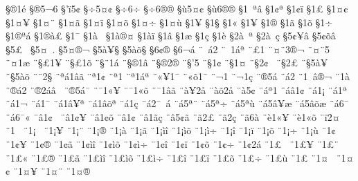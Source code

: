 {^^a7^^ae1^^e9
^^a7^^ae5^^ac6
^^a7'^^ef5^^a2
^^a7^^f75^^a4^^a2
^^a7^^f76^^ad^^f7
^^a7^^f76^^ae^^ad^^ae
^^a7^^f95^^a4^^a2
^^a7^^f96^^ae^^ad^^ae
^^a71^^a0^^aa^^e2
^^a71^^a2^^aa
^^a71^^a2^^ef
^^a71^^a3
^^a71^^a4^^a2
^^a71^^a4^^a5
^^a71^^a4^^a8
^^a71^^a4^^e3
^^a71^^a4^^ef
^^a71^^a4^^f5
^^a71^^a4^^f7
^^a71^^a4^^f9
^^a71^^a5
^^a71^^a7
^^a71^^ab
^^a71^^ad^^a5
^^a71^^ad^^ae
^^a71^^ad^^e3
^^a71^^ad^^f5
^^a71^^ad^^f7
^^a71^^ae^^aa^^e1
^^a71^^ae^^e0^^a3
^^a71^^af
^^a71^^e0^^a0
^^a71^^e0^^ae^^a4
^^a71^^e0^^ef
^^a71^^e2
^^a71^^e6
^^a71^^e7
^^a71^^e8
^^a72^^e0^^a0^^aa
^^a72^^e0^^a0^^e7
^^a75^^a2^^a5^^e2
^^a75^^a2^^f5^^e2
^^a75^^a3^^ad^^a0
^^a75^^a4^^a0.
^^a75^^a4^^ae^^ac
^^a75^^e0^^a5^^a7
^^a75^^e0^^f5^^a7
^^a76^^a2^^ae^^ad
^^a76^^ac^^e1
^^a8^^a0^^e12
^^a8^^a01^^e1^^aa
^^a8^^a31^^ad
^^a8^^a4^^a83^^ae^^ac
^^a8^^a4^^a85^^a0
^^a8^^a41^^e6
^^a8^^a7^^a31^^ad^^a5
^^a8^^a7^^a31^^ad^^f5
^^a8^^a7^^a81^^e1
^^a8^^a7^^ae1^^e2
^^a8^^a7^^ae2^^ae
^^a8^^a7'5
^^a8^^a71^^a2
^^a8^^a71^^a4
^^a8^^a72^^a2^^a0
^^a8^^a72^^a3^^ad
^^a8^^a75^^e0^^a5
^^a8^^a75^^e0^^f5
^^a8^^a82^^a7
^^a8^^aa^^e11^^e2^^e3
^^a8^^aa1^^a2
^^a8^^aa1^^ad
^^a8^^aa1^^e1^^aa
^^a8^^ab^^a51^^af
^^a8^^ab^^f51^^af
^^a8^^ac1^^ad
^^a8^^ac1^^e7
^^a8^^ad^^ae5^^e1
^^a8^^ad^^e12
^^a8^^ad1^^a0^^e2^^ae^^ac
^^a8^^ad1^^e0
^^a8^^ae^^e12
^^a8^^ae2^^e1^^e2^^a0
^^a8^^ae5^^e1^^af
^^a8^^af1^^ab^^a5
^^a8^^af1^^ab^^f5
^^a8^^af1^^e2^^e3
^^a8^^e0^^a52^^e5
^^a8^^e0^^f52^^e5
^^a8^^e05^^a2
^^a8^^e1^^aa1^^ad
^^a8^^e1^^e21^^a2
^^a8^^e11^^a1
^^a8^^e11^^aa
^^a8^^e11^^ac
^^a8^^e11^^af
^^a8^^e11^^e2^^a5^^aa
^^a8^^e11^^e2^^f5^^aa
^^a8^^e11^^e7
^^a8^^e12^^af^^a0^^e1
^^a8^^e15^^aa^^a8
^^a8^^e15^^aa^^f7
^^a8^^e15^^aa^^f9
^^a8^^e15^^e2^^a5^^e6
^^a8^^e15^^e2^^f5^^e6
^^a8^^e16^^af^^a0
^^a8^^e16^^af^^ab
^^a8^^e21^^a2^^a0
^^a8^^e21^^a2^^a5
^^a8^^e21^^a2^^f5
^^a8^^e21^^a2
^^a8^^e21^^e3^^e7
^^a8^^e25^^a2^^e3
^^a8^^e32^^a3
^^a8^^e32^^e7
^^a8^^e36^^e0
^^a8^^e81^^ab^^a5
^^a8^^e81^^ab^^f5
^^a8^^ef2^^a4
^^a81^^a0
^^a81^^a1^^a0
^^a81^^a1^^a5
^^a81^^a1^^a8
^^a81^^a1^^ae
^^a81^^a1^^e0
^^a81^^a1^^e3
^^a81^^a1^^ec^^ee
^^a81^^a1^^ec^^f5
^^a81^^a1^^ec^^f7
^^a81^^a1^^ee
^^a81^^a1^^ef
^^a81^^a1^^f5
^^a81^^a1^^f7
^^a81^^a1^^f9
^^a81^^a2^^a0
^^a81^^a2^^a5
^^a81^^a2^^ae
^^a81^^a2^^e3
^^a81^^a2^^ec^^ee
^^a81^^a2^^ec^^f5
^^a81^^a2^^ec^^f7
^^a81^^a2^^ee
^^a81^^a2^^ef
^^a81^^a2^^f5
^^a81^^a2^^f7
^^a81^^a22^^e1
^^a81^^a3^^a0
^^a81^^a3^^a5
^^a81^^a3^^a8
^^a81^^a3^^ab
^^a81^^a3^^ae
^^a81^^a3^^e3
^^a81^^a3^^ec^^ee
^^a81^^a3^^ec^^f5
^^a81^^a3^^ec^^f7
^^a81^^a3^^ee
^^a81^^a3^^ef
^^a81^^a3^^f5
^^a81^^a3^^f7
^^a81^^a3^^f9
^^a81^^a3
^^a81^^a4^^a0
^^a81^^a4^^a2
^^a81^^a4^^a5
^^a81^^a4^^a8
^^a81^^a4^^ae
}
